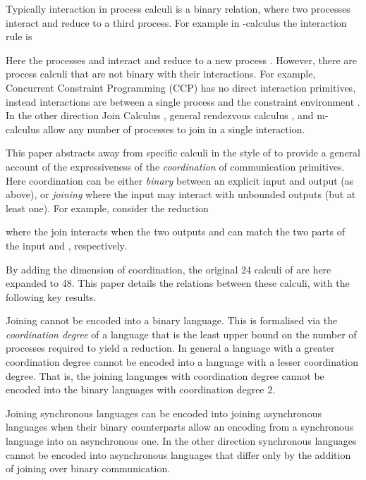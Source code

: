 \documentclass[submission,copyright,creativecommons]{eptcs}
\begin{document}
Typically interaction in process calculi is a binary relation, where two processes interact
and reduce to a third process. For example in -calculus the interaction rule is

Here the processes  and  interact and reduce to a new process .
However, there are process calculi that are not binary with their interactions.
For example, Concurrent Constraint Programming (CCP) has no direct interaction primitives, instead interactions are between a single process and the constraint environment \cite{Saraswat:1991:SFC:99583.99627}.
In the other direction Join Calculus \cite{Fournet_thereflexive}, general rendezvous calculus \cite{Bocchi2004119}, and m-calculus \cite{DBLP:conf/popl/SchmittS03}
allow any number of processes to join in a single interaction. 

This paper abstracts away from specific calculi in the style of \cite{G:IC08,givenwilson:hal-01026301}
to provide a general account of the expressiveness of the {\em coordination} of
communication primitives.
Here coordination can be either {\em binary} between an explicit input and output (as above),
or {\em joining} where the input may interact with unbounded outputs (but at least one).
For example, consider the reduction

where the join  interacts when the two outputs  and  can
match the two parts of the input  and , respectively.


By adding the dimension of coordination, the original 24 calculi of
\cite{G:IC08,givenwilson:hal-01026301}
are here expanded to 48.
This paper details the relations between these calculi, with the following key results.

Joining cannot be encoded into a binary language. This is formalised via the {\em coordination degree}
of a language that is the least upper bound on the number of processes required to yield a reduction.
In general a language with a greater coordination degree cannot be encoded into a language with a
lesser coordination degree. That is, the joining languages with  coordination degree cannot be
encoded into the binary languages with coordination degree 2.

Joining synchronous languages can be encoded into joining asynchronous languages when their binary
counterparts allow an encoding from a synchronous language into an asynchronous one.
In the other direction synchronous languages cannot be encoded into
asynchronous languages that differ only by the addition of joining over binary communication.
\end{document}

